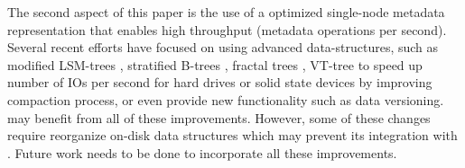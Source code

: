 The second aspect of this paper is the use of a optimized single-node metadata
representation that enables high throughput (metadata operations per second).
Several recent efforts have focused on using advanced data-structures, such
as modified LSM-trees \cite{blsm}, stratified B-trees \cite{Andrew11},
fractal trees \cite{tokufs}, VT-tree \cite{VTtree}
to speed up number of IOs per second for hard drives or solid state devices
by improving compaction process, or even provide new functionality
such as data versioning. \tfs may benefit from all of these improvements.
However, some of these changes require reorganize on-disk data structures
which may prevent its integration with \giga. Future work needs to be
done to incorporate all these improvements.

